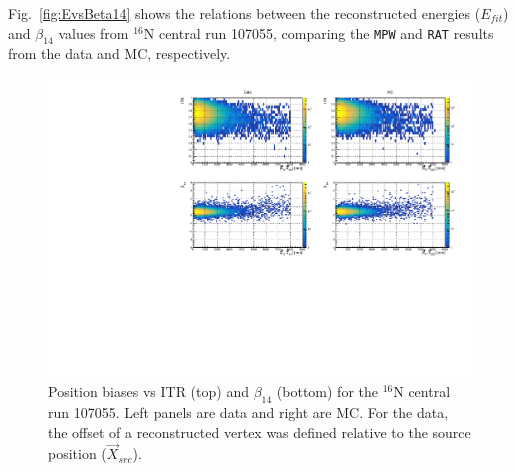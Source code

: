 Fig.~\ref{fig:EvsBeta14} shows the relations between the reconstructed energies ($E_{fit}$) and $\beta_{14}$ values from $^{16}$N central run 107055, comparing the \texttt{MPW} and \texttt{RAT} results from the data and MC, respectively. 

\begin{figure}
	\centering
	\includegraphics[width=14cm]{N16_107055_highLevelCuts.pdf}
	\caption[Position biases vs ITR and $\beta_{14}$ for the $^{16}$N central run 107055.]{Position biases vs ITR (top) and $\beta_{14}$ (bottom) for the $^{16}$N central run 107055. Left panels are data and right are MC. For the data, the offset of a reconstructed vertex was defined relative to the source position ($\vec{X}_{src}$). \label{n16_highLevelCut}}
\end{figure}


